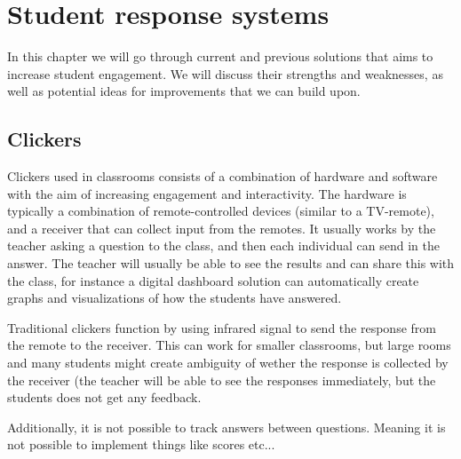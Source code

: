 \section{Student response systems}
In this chapter we will go through current and previous solutions that aims to increase student engagement. We will discuss their strengths and weaknesses, as well as potential ideas for improvements that we can build upon.

\subsection{Clickers}
Clickers used in classrooms consists of a combination of hardware and software with the aim of increasing engagement and interactivity. The hardware is typically a combination of remote-controlled devices (similar to a TV-remote), and a receiver that can collect input from the remotes. It usually works by the teacher asking a question to the class, and then each individual can send in the answer. The teacher will usually be able to see the results and can share this with the class, for instance a digital dashboard solution can automatically create graphs and visualizations of how the students have answered. 

Traditional clickers function by using infrared signal to send the response from the remote to the receiver. This can work for smaller classrooms, but large rooms and many students might create ambiguity of wether the response is collected by the receiver (the teacher will be able to see the responses immediately, but the students does not get any feedback. 

Additionally, it is not possible to track answers between questions. Meaning it is not possible to implement things like scores etc...

